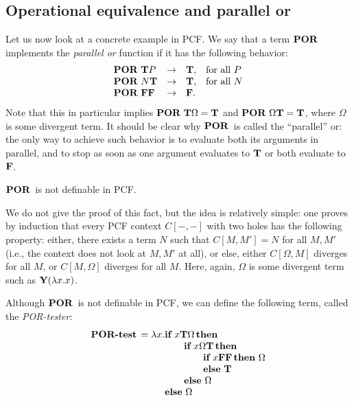\documentclass{article}
\begin{document}
\subsection{Operational equivalence and parallel or}

Let us now look at a concrete example in PCF. We say that a term $\mathop{\textbf{\bf POR}\,}$
implements the {\em parallel or} function if it has the following
behavior:
\[ \begin{array} {llll}
  \mathop{\textbf{\bf POR}\,}{\bf T} P &\to& {\bf T}, &\mbox{for all $P$} \\
  \mathop{\textbf{\bf POR}\,} N{\bf T} &\to& {\bf T}, &\mbox{for all $N$} \\
  \mathop{\textbf{\bf POR}\,}{\bf F}{\bf F} &\to& {\bf F}.
\end{array}
\]
Note that this in particular implies $\mathop{\textbf{\bf POR}\,}{\bf T}\Omega={\bf T}$ and
$\mathop{\textbf{\bf POR}\,}\Omega{\bf T}={\bf T}$, where $\Omega$ is some divergent term. It should
be clear why $\mathop{\textbf{\bf POR}\,}$ is called the ``parallel'' or: the only way to
achieve such behavior is to evaluate both its arguments in parallel,
and to stop as soon as one argument evaluates to ${\bf T}$ or both
evaluate to ${\bf F}$.

\begin{proposition}
  $\mathop{\textbf{\bf POR}\,}$ is not definable in PCF.
\end{proposition}

We do not give the proof of this fact, but the idea is relatively
simple: one proves by induction that every PCF context $C[-,-]$ with
two holes has the following property: either, there exists a term $N$
such that $C[M,M']=N$ for all $M,M'$ (i.e., the context does not look
at $M,M'$ at all), or else, either $C[\Omega,M]$ diverges for all $M$,
or $C[M,\Omega]$ diverges for all $M$. Here, again, $\Omega$ is some
divergent term such as ${\bf Y}(\lambda x.x)$. 

Although $\mathop{\textbf{\bf POR}\,}$ is not definable in PCF, we can define the following
term, called the {\em POR-tester}:
\[ \begin{array}{l@{}l}
  \nm{POR-test} = \lam x. 
  &            \nm{if} x \truet\Omega \nm{then} \\
  &\sep            \nm{if} x\Omega\truet\nm{then}\\
  &\sep\sep            \nm{if} x\falset\falset\nm{then}\Omega\\
  &\sep\sep            \nm{else}\truet\\
  &\sep            \nm{else}\Omega \\
  &            \nm{else}\Omega
\end{array}
\]
\end{document}
